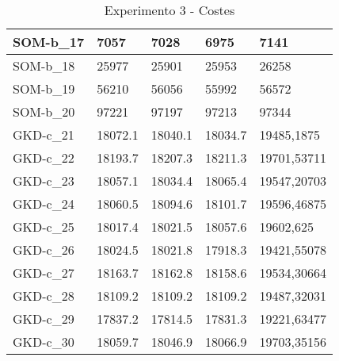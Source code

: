 \documentclass[11pt,a4paper]{article}
\begin{document}
\begin{table}[H]
\begin{tabular}{l|l|l|l|l|}
			\multicolumn{1}{|l|}{SOM-b\_17} & 7057           & 7028            & 6975        & 7141        \\ \hline
			\multicolumn{1}{|l|}{SOM-b\_18} & 25977          & 25901           & 25953       & 26258       \\ \hline
			\multicolumn{1}{|l|}{SOM-b\_19} & 56210          & 56056           & 55992       & 56572       \\ \hline
			\multicolumn{1}{|l|}{SOM-b\_20} & 97221          & 97197           & 97213       & 97344       \\ \hline
			\multicolumn{1}{|l|}{GKD-c\_21} & 18072.1        & 18040.1         & 18034.7     & 19485,1875  \\ \hline
			\multicolumn{1}{|l|}{GKD-c\_22} & 18193.7        & 18207.3         & 18211.3     & 19701,53711 \\ \hline
			\multicolumn{1}{|l|}{GKD-c\_23} & 18057.1        & 18034.4         & 18065.4     & 19547,20703 \\ \hline
			\multicolumn{1}{|l|}{GKD-c\_24} & 18060.5        & 18094.6         & 18101.7     & 19596,46875 \\ \hline
			\multicolumn{1}{|l|}{GKD-c\_25} & 18017.4        & 18021.5         & 18057.6     & 19602,625   \\ \hline
			\multicolumn{1}{|l|}{GKD-c\_26} & 18024.5        & 18021.8         & 17918.3     & 19421,55078 \\ \hline
			\multicolumn{1}{|l|}{GKD-c\_27} & 18163.7        & 18162.8         & 18158.6     & 19534,30664 \\ \hline
			\multicolumn{1}{|l|}{GKD-c\_28} & 18109.2        & 18109.2         & 18109.2     & 19487,32031 \\ \hline
			\multicolumn{1}{|l|}{GKD-c\_29} & 17837.2        & 17814.5         & 17831.3     & 19221,63477 \\ \hline
			\multicolumn{1}{|l|}{GKD-c\_30} & 18059.7        & 18046.9         & 18066.9     & 19703,35156 \\ \hline
		\end{tabular}
		\caption{ Experimento 3 - Costes }
		\label{costes3}
	\end{table}
	
\end{document}
